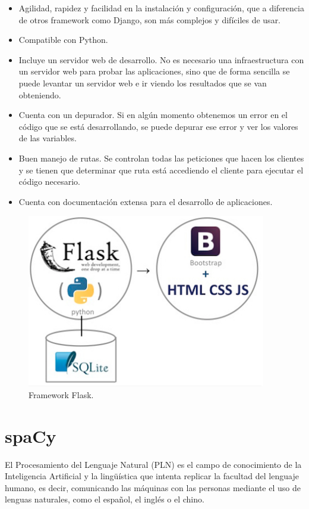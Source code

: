 \begin{itemize}
	\item Agilidad, rapidez y facilidad en la instalación y configuración, que a diferencia de otros framework como Django, son más complejos y difíciles de usar.
	\item Compatible con Python.
	\item Incluye un servidor web de desarrollo. No es necesario una infraestructura con un servidor web para probar las aplicaciones, sino que de forma sencilla se puede levantar un servidor web e ir viendo los resultados que se van obteniendo.
	\item Cuenta con un depurador. Si en algún momento obtenemos un error en el código que se está desarrollando, se puede depurar ese error y ver los valores de las variables.
	\item Buen manejo de rutas. Se controlan todas las peticiones que hacen los clientes y se tienen que determinar que ruta está accediendo el cliente para ejecutar el código necesario.
	\item Cuenta con documentación extensa para el desarrollo de aplicaciones.
\end{itemize}

\begin{figure}[h!]
	\centering
	
	
	\includegraphics[scale=0.9]{Imagenes/Figuras/Flask}
	
	
	\caption{Framework Flask.}
	\label{fig:entornoFlask}
\end{figure}


\section{spaCy}\label{sec:spacy}

El Procesamiento del Lenguaje Natural (PLN) es el campo de conocimiento de la Inteligencia Artificial y la lingüística que intenta replicar la facultad del lenguaje humano, es decir, comunicando las máquinas con las personas mediante el uso de lenguas naturales, como el español, el inglés o el chino.

